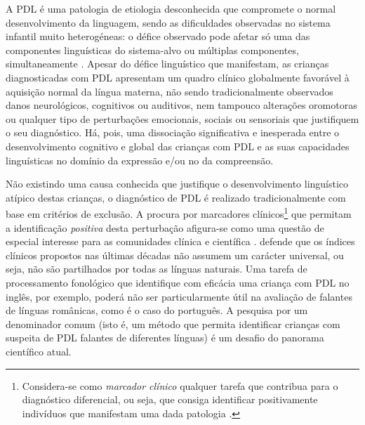 \documentclass[output=paper,colorlinks,citecolor=brown,booklanguage=portuguese]{langscibook}
\begin{document}
A PDL é uma patologia de etiologia desconhecida que compromete o normal desenvolvimento da linguagem, sendo as dificuldades observadas no sistema infantil muito heterogéneas: o défice observado pode afetar só uma das componentes linguísticas do sistema-alvo ou múltiplas componentes, simultaneamente \citep{Bishop2017a, Friedmann2008, Leonard2014a}. Apesar do défice linguístico que manifestam, as crianças diagnosticadas com PDL apresentam um quadro clínico globalmente favorável à aquisição normal da língua materna, não sendo tradicionalmente observados danos neurológicos, cognitivos ou auditivos, nem tampouco alterações oromotoras ou qualquer tipo de perturbações emocionais, sociais ou sensoriais que justifiquem o seu diagnóstico. Há, pois, uma dissociação significativa e inesperada entre o desenvolvimento cognitivo e global das crianças com PDL e as suas capacidades linguísticas no domínio da expressão e/ou no da compreensão.

Não existindo uma causa conhecida que justifique o desenvolvimento linguístico atípico destas crianças, o diagnóstico de PDL é realizado tradicionalmente com base em critérios de exclusão. A procura por marcadores clínicos\footnote{Considera-se como \emph{marcador clínico} qualquer tarefa que contribua para o diagnóstico diferencial, ou seja, que consiga identificar positivamente indivíduos que manifestam uma dada patologia \citep{ContiRamsdem2001}.} que permitam a identificação \emph{positiva} desta perturbação afigura-se como uma questão de especial interesse para as comunidades clínica e científica \citep{Ribeiro2011}. \citet{Leonard2014b} defende que os índices clínicos propostos nas últimas décadas não assumem um carácter universal, ou seja, não são partilhados por todas as línguas naturais. Uma tarefa de processamento fonológico que identifique com eficácia uma criança com PDL no inglês, por exemplo, poderá não ser particularmente útil na avaliação de falantes de línguas românicas, como é o caso do português. A pesquisa por um denominador comum (isto é, um método que permita identificar crianças com suspeita de PDL falantes de diferentes línguas) é um desafio do panorama científico atual.
\end{document}
